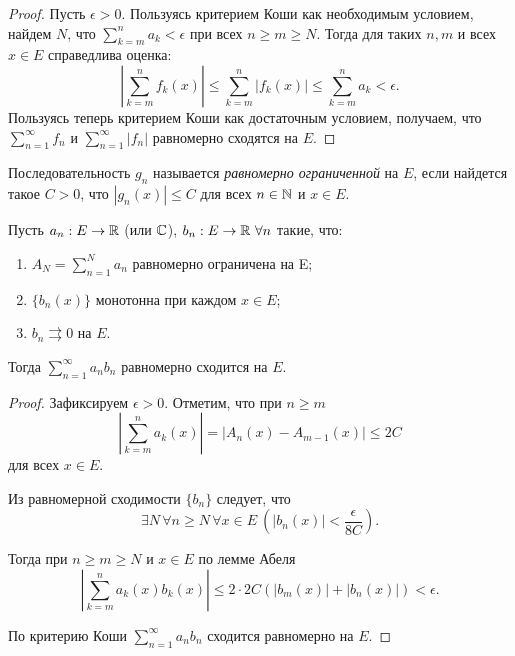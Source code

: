 \begin{proof}
    Пусть $\epsilon > 0$. Пользуясь критерием Коши как необходимым условием, найдем $N$, что $\sum_{k = m}^{n} a_{k} < \epsilon$ при всех $n \geq m \geq N$. Тогда для таких $n, m$ и всех $x \in E$ справедлива оценка:
    \[\left| \sum_{k = m}^{n} f_{k}(x)\right| \leq \sum_{k = m}^{n} |f_{k}(x)| \leq \sum_{k = m}^{n} a_{k} < \epsilon.\]
    Пользуясь теперь критерием Коши как достаточным условием, получаем, что $\sum_{n=1}^{\infty} f_{n}$ и $\sum_{n=1}^{\infty} |f_{n}|$ равномерно сходятся на $E$.
\end{proof}

\begin{definition}
    Последовательность $g_{n}$ называется \textit{равномерно ограниченной} на $E$, если найдется такое $C > 0$, что $|g_{n}(x)| \leq C$ для всех $n \in \mathbb{N}$ и $x \in E$.
\end{definition}

\begin{theorem}
    \label{dirichlet-func-series}
    Пусть $a_{n}: E \to \mathbb{R}$ (или $\mathbb{C}$), $b_{n}: E \to \mathbb{R} \ \forall n$ такие, что:
    \begin{enumerate}
        \item $A_{N} = \sum_{n = 1}^{N} a_{n}$ равномерно ограничена на E;
        \item $\{b_{n}(x)\}$ монотонна при каждом $x \in E$;
        \item $b_{n} \rightrightarrows 0$ на $E$.
    \end{enumerate}
    Тогда $\sum_{n = 1}^{\infty} a_{n}b_{n}$ равномерно сходится на $E$.
\end{theorem}

\begin{proof}
    Зафиксируем $\epsilon > 0$. Отметим, что при $n \ge m$
    \[\left|\sum_{k = m}^n a_k(x)\right| = |A_n(x) - A_{m - 1}(x)| \le 2C \]
    для всех $x \in E$.

    Из равномерной сходимости $\{b_n\}$ следует, что
    \[\exists N \, \forall n \ge N \, \forall x \in E \ \left(|b_n(x)| < \frac{\epsilon}{8C}\right).\]

    Тогда при $n \ge m \ge N$ и $x \in E$ по лемме Абеля
    \[\left|\sum_{k = m}^n a_k(x) b_k(x)\right| \le 2 \cdot 2C \left(|b_m(x)| + |b_n(x)|\right) < \epsilon.\]

    По критерию Коши $\sum_{n = 1}^\infty a_n b_n$ сходится равномерно на $E$.
\end{proof}


